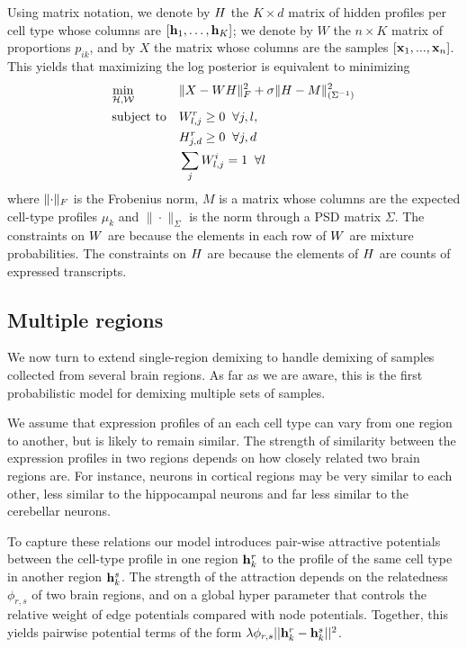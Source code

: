 Using matrix notation, we denote by ${H}$ the $K \times d$ matrix of hidden profiles per cell type whose columns are $\left[{\mathbf{h}_1, \ldots, \mathbf{h}_K}\right]$; we denote by $W$ the $n \times K$ matrix of proportions $p_{ik}$,
and by $X$ the matrix whose columns are the samples $\left[{\mathbf{x}_1,..., \mathbf{x}_n}\right]$. This yields that maximizing the log posterior is equivalent to minimizing 
\begin{equation}
    \label{eq-single}
    \begin{aligned}
        & \underset{\cal{{H}},\cal{W}}{\text{min}}  
        & & \|{X - W {H}}\|_F^2 + \sigma \|{ {H} - M }\|^2_{(\Sigma^{-1})}\\
            & \text{subject to} &
            & W^r_{l,j} \geq 0 \;\; \forall j, l, \\
        & & & H^r_{j,d} \geq 0 \;\;\forall j, d \\
        & & & \sum_j W^i_{l,j} = 1 \;\; \forall l \\
        \end{aligned}
\end{equation}
where $\|{\cdot}\|_F$ is the Frobenius norm, $M$ is a matrix whose columns are the expected cell-type profiles $\mu_k$ and  $\|\cdot\|_{\Sigma}$ is the norm through a PSD matrix $\Sigma$. The constraints on $W$ are because the elements in each row of $W$ are mixture probabilities. The constraints on ${H}$ are because the elements of ${H}$ are counts of expressed transcripts.

\subsection{Multiple regions}
We now turn to extend single-region demixing to handle demixing of samples collected from several brain regions. 
As far as we are aware, this is the first probabilistic model for demixing multiple sets of samples.

We assume that expression profiles of an each cell type can vary from one region to another, but is likely to remain similar. The strength of similarity between the expression profiles in two regions depends on how closely related two brain regions are. For instance, neurons in cortical regions may be very similar to each other, less similar to the hippocampal neurons and far less similar to the cerebellar neurons. 

To capture these relations our model introduces pair-wise attractive potentials between the cell-type profile in one region $\mathbf{h}^r_k$ to the profile of the same cell type in another region $\mathbf{h}^s_k$. The strength of the attraction depends on the relatedness $\phi_{r,s}$ of two brain regions, and on a global hyper parameter that controls the relative weight of edge potentials compared with node potentials. Together, this yields pairwise potential terms of the form 
$\lambda \phi_{r,s}|| \mathbf{h}^r_k - \mathbf{h}^s_k||^2$.

